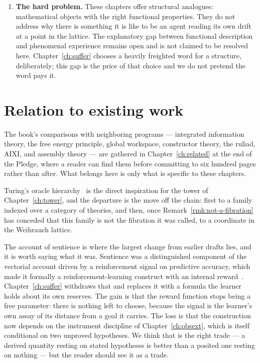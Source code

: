 \begin{enumerate}[label=\textbf{Gap \arabic*.}, leftmargin=*, itemsep=8pt]
  \item \textbf{The hard problem.}
        These chapters offer structural analogues: mathematical objects
        with the right functional properties.
        They do not address why there is something it is like to be an
        agent reading its own drift at a point in the lattice.
        The explanatory gap between functional description and phenomenal
        experience remains open and is not claimed to be resolved here.
        Chapter~\ref{ch:suffer} chooses a heavily freighted word for a
        structure, deliberately; this gap is the price of that choice and
        we do not pretend the word pays it.

\end{enumerate}

\section{Relation to existing work}
\label{sec:hyper-discussion}

The book's comparisons with neighboring programs --- integrated
information theory, the free energy principle, global workspace,
constructor theory, the ruliad, AIXI, and assembly theory --- are gathered
in Chapter~\ref{ch:related} at the end of the Pledge, where a reader can
find them before committing to six hundred pages rather than after.
What belongs here is only what is specific to these chapters.

Turing's oracle hierarchy~\cite{turing1939} is the direct inspiration for
the tower of Chapter~\ref{ch:tower}, and the departure is the move off
the chain: first to a family indexed over a category of theories, and
then, once Remark~\ref{rmk:not-a-fibration} has conceded that this family
is not the fibration it was called, to a coordinate in the Weihrauch
lattice.

The account of sentience is where the largest change from earlier drafts
lies, and it is worth saying what it was.
Sentience was a distinguished component of the vectorial account driven
by a reinforcement signal on predictive accuracy, which made it formally
a reinforcement-learning construct with an internal
reward~\cite{sutton2018reinforcement}.
Chapter~\ref{ch:suffer} withdraws that and replaces it with a formula the
learner holds about its own reserves.
The gain is that the reward function stops being a free parameter: there
is nothing left to choose, because the signal is the learner's own assay
of its distance from a goal it carries.
The loss is that the construction now depends on the instrument
discipline of Chapter~\ref{ch:obsext}, which is itself conditional on two
unproved hypotheses.
We think that is the right trade --- a derived quantity resting on stated
hypotheses is better than a posited one resting on nothing --- but the
reader should see it as a trade.

